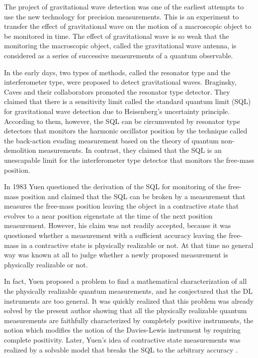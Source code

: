 \documentclass[12pt]{article}
\begin{document}
The project of gravitational wave detection was one of the earliest 
attempts to use the new technology for precision measurements.
This is an experiment to transfer the effect of gravitational wave 
on the motion of a macroscopic object to be monitored in time.
The effect of gravitational wave is so weak that the monitoring 
the macroscopic object, called the gravitational wave antenna, is
considered as a series of successive measurements of 
a quantum observable.

In the early days,  two types of methods, called the resonator type 
and the interferometer type, were proposed to detect gravitational waves.
Braginsky, Caves and their collaborators \cite{BVT80,CTDSZ80} promoted 
the resonator type detector.
They claimed that there is a sensitivity limit called the standard
quantum limit (SQL) for gravitational wave detection due to Heisenberg's
uncertainty principle.  According to them, however, the SQL can be circumvented 
by resonator type detectors that monitors the harmonic oscillator position
by the technique called the back-action evading measurement
based on the theory of quantum non-demolition measurements.
In contrast, they claimed that the SQL is an unescapable limit 
for the interferometer type detector that monitors the free-mass position.

In 1983 Yuen \cite{Yue83} questioned the derivation
of the SQL for monitoring of the free-mass position and claimed
that the SQL can be broken by a measurement 
that measures the free-mass position leaving the object in a
contractive state that evolves to a near position eigenstate 
at the time of the next position measurement.
However, his claim was not readily accepted, because it was questioned 
whether a measurement with a sufficient accuracy
leaving the free-mass in a contractive state is physically realizable or not.
At that time no general way was known at all to judge whether 
a newly proposed measurement is physically realizable or not.

In fact,  Yuen \cite{Yue87} proposed a problem to find a mathematical 
characterization of all the physically realizable quantum measurements,
and he conjectured that the DL instruments are too general.
It was quickly realized that this problem was already solved 
by the present author \cite{84QC} showing that all the physically realizable
quantum measurements are faithfully characterized by completely
positive instruments, the notion which modifies the notion of the
Davies-Lewis instrument by requiring complete positivity.
Later, Yuen's idea of contractive state measurements was realized 
by a solvable model that breaks the SQL to the arbitrary accuracy 
\cite{88MS,89RS,Mad88}.  
\end{document}
